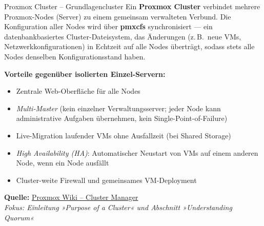 \documentclass[a4paper,10pt,addpoints]{exam}
\begin{document}
\begin{infoBox}{Proxmox Cluster -- Grundlagen}{cluster}
  Ein \textbf{Proxmox Cluster} verbindet mehrere Proxmox-Nodes (Server) zu einem
  gemeinsam verwalteten Verbund.
  Die Konfiguration aller Nodes wird über \textbf{pmxcfs} synchronisiert ---
  ein datenbankbasiertes Cluster-Dateisystem, das Änderungen (z.\,B.\ neue VMs,
  Netzwerkkonfigurationen) in Echtzeit auf alle Nodes überträgt, sodass stets
  alle Nodes denselben Konfigurationsstand haben.

  \medskip
  \textbf{Vorteile gegenüber isolierten Einzel-Servern:}
  \begin{itemize}
    \item Zentrale Web-Oberfläche für alle Nodes
    \item \emph{Multi-Master} (kein einzelner Verwaltungsserver; jeder Node kann
      administrative Aufgaben übernehmen, kein Single-Point-of-Failure)
    \item Live-Migration laufender VMs ohne Ausfallzeit (bei Shared Storage)
    \item \emph{High Availability (HA)}: Automatischer Neustart von VMs auf einem
      anderen Node, wenn ein Node ausfällt
    \item Cluster-weite Firewall und gemeinsames VM-Deployment
  \end{itemize}

  \medskip\small
  \textbf{Quelle:} \href{https://pve.proxmox.com/wiki/Cluster_Manager}{Proxmox Wiki -- Cluster Manager}\\
  \hspace*{0.4em}\textit{Fokus: Einleitung »Purpose of a Cluster« und
    Abschnitt »Understanding Quorum«}
\end{infoBox}
\end{document}
